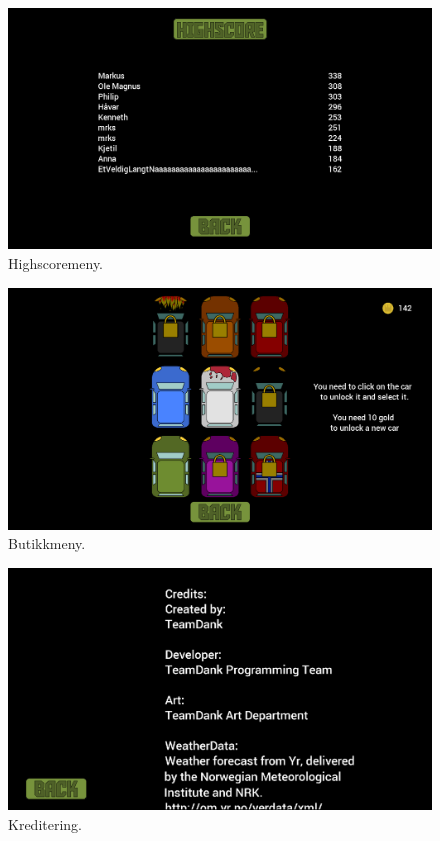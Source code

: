 \documentclass[paper=a4]{article}
\begin{document}
	\begin{figure}\begin{center}
		\includegraphics[width=1.00\textwidth]{images/hs_menu.PNG}
		\caption{Highscoremeny.}
	\end{center}\end{figure}

	\begin{figure}\begin{center}
		\includegraphics[width=1.00\textwidth]{images/shop_menu.PNG}
		\caption{Butikkmeny.}
	\end{center}\end{figure}

	\begin{figure}\begin{center}
		\includegraphics[width=1.00\textwidth]{images/credits.PNG}
		\caption{Kreditering.}
	\end{center}\end{figure}
\end{document}
